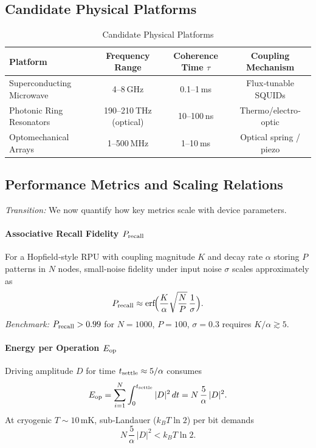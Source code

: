 \subsection{Candidate Physical Platforms}
\begin{table}[ht]
  \centering
  \caption{Candidate Physical Platforms}
  \begin{tabular}{@{}lccc@{}}
    \toprule
    Platform                   & Frequency Range          & Coherence Time $\tau$       & Coupling Mechanism \\
    \midrule
    Superconducting Microwave  & 4–8 GHz                  & 0.1–1 ms                    & Flux‐tunable SQUIDs \\
    Photonic Ring Resonators   & 190–210 THz (optical)    & 10–100 ns                   & Thermo/electro‐optic \\
    Optomechanical Arrays      & 1–500 MHz                & 1–10 ms                     & Optical spring / piezo \\
    \bottomrule
  \end{tabular}
\end{table}

\subsection{Performance Metrics and Scaling Relations}
\emph{Transition:} We now quantify how key metrics scale with device parameters.

\paragraph{Associative Recall Fidelity $P_{\rm recall}$}  
For a Hopfield‐style RPU with coupling magnitude $K$ and decay rate $\alpha$ storing $P$ patterns in $N$ nodes, small‐noise fidelity under input noise $\sigma$ scales approximately as
\[
P_{\rm recall} \approx \operatorname{erf}\!\Bigl(\frac{K}{\alpha}\sqrt{\frac{N}{P}}\,\frac{1}{\sigma}\Bigr).
\]
\emph{Benchmark:} $P_{\rm recall}>0.99$ for $N=1000$, $P=100$, $\sigma=0.3$ requires $K/\alpha\gtrsim5$.

\paragraph{Energy per Operation $E_{\rm op}$}  
Driving amplitude $D$ for time $t_{\rm settle}\approx5/\alpha$ consumes
\[
E_{\rm op} = \sum_{i=1}^N \int_0^{t_{\rm settle}} |D|^2\,dt
= N\,\frac{5}{\alpha}\,|D|^2.
\]
At cryogenic $T\sim10\,$mK, sub‐Landauer ($k_BT\ln2$) per bit demands
\[
N\,\frac{5}{\alpha}\,|D|^2 < k_BT\ln2.
\]

